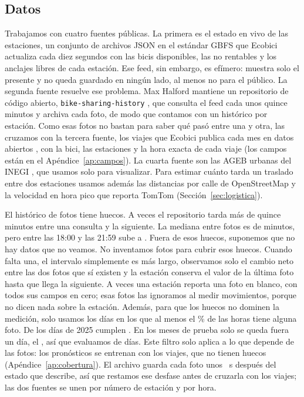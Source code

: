 \documentclass[conference,letterpaper,10pt]{IEEEtran}
\begin{document}
\subsection{Datos}\label{sec:fuentes}
Trabajamos con cuatro fuentes públicas. La primera es el estado en vivo de las estaciones, un conjunto de archivos JSON en el estándar GBFS \cite{gbfs} que Ecobici actualiza cada diez segundos con las bicis disponibles, las no rentables y los anclajes libres de cada estación. Ese feed, sin embargo, es efímero: muestra solo el presente y no queda guardado en ningún lado, al menos no para el público. La segunda fuente resuelve ese problema. Max Halford mantiene un repositorio de código abierto, \texttt{bike-sharing-history} \cite{halford_bsh}, que consulta el feed cada unos quince minutos y archiva cada foto, de modo que contamos con un histórico por estación. Como esas fotos no bastan para saber qué pasó entre una y otra, las cruzamos con la tercera fuente, los viajes que Ecobici publica cada mes en datos abiertos \cite{ecobici_datos}, con la bici, las estaciones y la hora exacta de cada viaje (los campos están en el Apéndice~\ref{ap:campos}). La cuarta fuente son las AGEB urbanas del INEGI \cite{inegi_mg2024}, que usamos solo para visualizar. Para estimar cuánto tarda un traslado entre dos estaciones usamos además las distancias por calle de OpenStreetMap \cite{osm} y la velocidad en hora pico que reporta TomTom \cite{tomtom2025} (Sección~\ref{sec:logistica}).

El histórico de fotos tiene huecos. A veces el repositorio tarda más de quince minutos entre una consulta y la siguiente. La mediana entre fotos es de \rhuecoMed{} minutos, pero entre las 18:00 y las 21:59 sube a \rhuecoTarde. Fuera de esos huecos, suponemos que no hay datos que no veamos. No inventamos fotos para cubrir esos huecos. Cuando falta una, el intervalo simplemente es más largo, observamos solo el cambio neto entre las dos fotos que sí existen y la estación conserva el valor de la última foto hasta que llega la siguiente. A veces una estación reporta una foto en blanco, con todos sus campos en cero; esas fotos las ignoramos al medir movimientos, porque no dicen nada sobre la estación. Además, para que los huecos no dominen la medición, solo usamos los días en los que al menos el \rcovMin\% de las horas tiene alguna foto. De los \cvDiasVeinticinco{} días de 2025 cumplen \cvOkVeinticinco. En los meses de prueba solo se queda fuera un día, el \cvDiaExcl, así que evaluamos \cvOkPrueba{} de \cvDiasPrueba{} días. Este filtro solo aplica a lo que depende de las fotos: los pronósticos se entrenan con los viajes, que no tienen huecos (Apéndice~\ref{ap:cobertura}). El archivo guarda cada foto unos \rlagS{}~s después del estado que describe, así que restamos ese desfase antes de cruzarla con los viajes; las dos fuentes se unen por número de estación y por hora.
\end{document}
